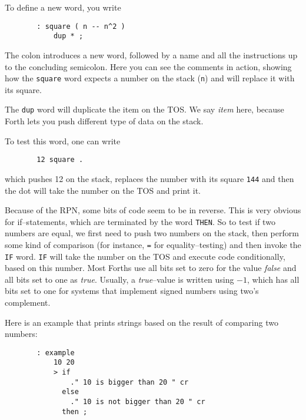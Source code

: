 To define a new word, you write

\begin{figure}[H]
  \centering
  \begin{Verbatim}
  : square ( n -- n^2 )
      dup * ;
  \end{Verbatim}
\end{figure}

The colon introduces a new word, followed by a name and all the instructions
up to the concluding semicolon.  Here you can see the comments in action,
showing how the \texttt{square} word expects a number on the stack
(\texttt{n}) and will replace it with its square.

The \texttt{dup} word will duplicate the item on the \ac{TOS}.  We
say \textit{item} here, because Forth lets you push different type of data
on the stack.

To test this word, one can write 

\begin{figure}[H]
  \centering
  \begin{Verbatim}
  12 square .
  \end{Verbatim}
\end{figure}

which pushes 12 on the stack, replaces the number with its square
\texttt{144} and then the dot will take the number on the \ac{TOS}
and print it.

Because of the \ac{RPN}, some bits of code seem to be in reverse.  This is
very obvious for if--statements, which are terminated by the word
\texttt{THEN}.  So to test if two numbers are equal, we first need to push
two numbers on the stack, then perform some kind of comparison (for
instance, \texttt{=} for equality--testing) and then invoke the
\texttt{IF} word.  \texttt{IF} will take the number on the \ac{TOS}
and execute code conditionally, based on this number.  Most Forths use all
bits set to zero for the value \textit{false} and all bits set to one as
\textit{true}.  Usually, a \textit{true}--value is written using $-1$,
which has all bits set to one for systems that implement signed numbers
using two's complement.

Here is an example that prints strings based on the result of comparing two
numbers:

\begin{figure}[H]
  \centering
  \begin{Verbatim}
  : example
      10 20
      > if
          ." 10 is bigger than 20 " cr
        else
          ." 10 is not bigger than 20 " cr
        then ;
  \end{Verbatim}
\end{figure}

